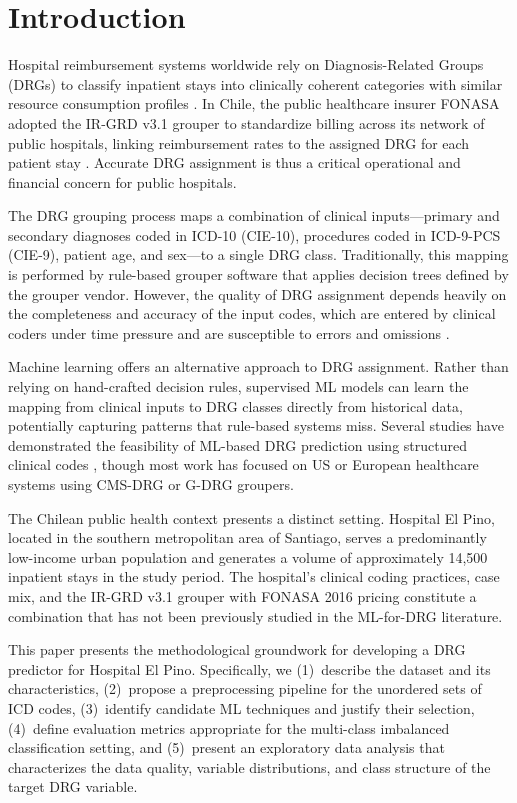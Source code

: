 \section{Introduction}

Hospital reimbursement systems worldwide rely on Diagnosis-Related Groups (DRGs) to classify inpatient stays into clinically coherent categories with similar resource consumption profiles \cite{fetter1980drg}. In Chile, the public healthcare insurer FONASA adopted the IR-GRD v3.1 grouper to standardize billing across its network of public hospitals, linking reimbursement rates to the assigned DRG for each patient stay \cite{fonasa2016}. Accurate DRG assignment is thus a critical operational and financial concern for public hospitals.

The DRG grouping process maps a combination of clinical inputs---primary and secondary diagnoses coded in ICD-10 (CIE-10), procedures coded in ICD-9-PCS (CIE-9), patient age, and sex---to a single DRG class. Traditionally, this mapping is performed by rule-based grouper software that applies decision trees defined by the grouper vendor. However, the quality of DRG assignment depends heavily on the completeness and accuracy of the input codes, which are entered by clinical coders under time pressure and are susceptible to errors and omissions \cite{seroussi2017drg}.

Machine learning offers an alternative approach to DRG assignment. Rather than relying on hand-crafted decision rules, supervised ML models can learn the mapping from clinical inputs to DRG classes directly from historical data, potentially capturing patterns that rule-based systems miss. Several studies have demonstrated the feasibility of ML-based DRG prediction using structured clinical codes \cite{gartner2015ml, rajkomar2018scalable}, though most work has focused on US or European healthcare systems using CMS-DRG or G-DRG groupers.

The Chilean public health context presents a distinct setting. Hospital El Pino, located in the southern metropolitan area of Santiago, serves a predominantly low-income urban population and generates a volume of approximately 14,500 inpatient stays in the study period. The hospital's clinical coding practices, case mix, and the IR-GRD v3.1 grouper with FONASA 2016 pricing constitute a combination that has not been previously studied in the ML-for-DRG literature.

This paper presents the methodological groundwork for developing a DRG predictor for Hospital El Pino. Specifically, we (1)~describe the dataset and its characteristics, (2)~propose a preprocessing pipeline for the unordered sets of ICD codes, (3)~identify candidate ML techniques and justify their selection, (4)~define evaluation metrics appropriate for the multi-class imbalanced classification setting, and (5)~present an exploratory data analysis that characterizes the data quality, variable distributions, and class structure of the target DRG variable.

